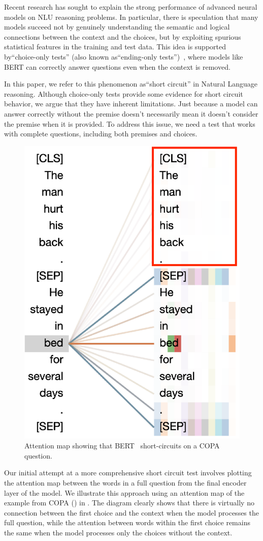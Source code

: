 Recent research has sought to explain the strong performance of advanced neural models on NLU reasoning problems. In particular, there is speculation that many models succeed not by genuinely understanding the semantic and logical connections between the context and the choices, but by exploiting spurious statistical features in the training and test data. This idea is supported by``choice-only tests'' (also known as``ending-only tests'')~\cite{endingonly1,endingonly2}, where models like BERT can correctly answer questions even when the context is removed.

In this paper, we refer to this phenomenon as``short circuit'' in Natural Language reasoning. Although choice-only tests provide some evidence for short circuit behavior, we argue that they have inherent limitations. Just because a model can answer correctly without the premise doesn't necessarily mean it doesn't consider the premise when it is provided. To address this issue, we need a test that works with complete questions, including both premises and choices.
\begin{figure}[th!]
\centering
\includegraphics[width=0.6\columnwidth]{figure/end_related.eps}
\caption{Attention map showing that BERT~\cite{devlin2018bert} 
short-circuits on a COPA question.}
\label{fig:att-goodex}
\end{figure}



Our initial attempt at a more comprehensive short circuit test involves plotting the attention map between the words in a full question from the final encoder layer of the model. We illustrate this approach using an attention map of the example from COPA () in . The diagram clearly shows that there is virtually no connection between the first choice and the context when the model processes the full question, while the attention between words within the first choice remains the same when the model processes only the choices without the context.

